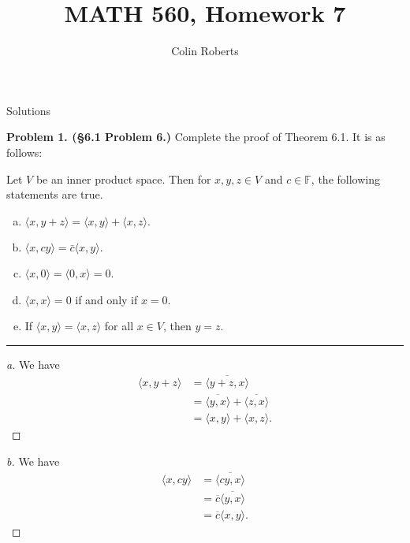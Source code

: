 \documentclass[leqno]{article}
\author{Colin Roberts}
\title{MATH 560, Homework 7}
\theoremstyle{nonumberplain}
\newtheorem{proof}{Proof}
\begin{document}
\maketitle
\begin{large}
\begin{center}
Solutions
\end{center}
\end{large}
\pagebreak

\noindent\textbf{Problem 1. (\S 6.1 Problem 6.)} Complete the proof of Theorem 6.1.   It is as follows:

\noindent Let $V$ be an inner product space.  Then for $x,y,z \in V$ and $c\in \mathbb{F}$, the following statements are true.
\begin{enumerate}[(a)]
\item $\langle x,y+z\rangle = \langle x,y \rangle + \langle x,z\rangle$.
\item $\langle x,cy\rangle = \bar{c}\langle x,y \rangle.$
\item $\langle x,0\rangle = \langle 0, x \rangle = 0$.
\item $\langle x,x \rangle =0$ if and only if $x=0$.
\item If $\langle x,y \rangle = \langle x,z \rangle$ for all $x\in V$, then $y=z$.
\end{enumerate}
\noindent\rule[0.5ex]{\linewidth}{1pt}

\begin{proof}[a]
We have 
\begin{align*}
\langle x,y+z \rangle &= \overline{\langle y+z,x \rangle}\\
&= \overline{\langle y,x \rangle}+\overline{\langle z,x \rangle}\\
&=\langle x,y \rangle + \langle x,z \rangle.
\end{align*}
\end{proof}

\begin{proof}[b]
We have
\begin{align*}
\langle x,cy \rangle &= \overline{\langle cy,x \rangle}\\
&=\overline{c} \overline{\langle y,x \rangle}\\
&=\overline{c} \langle x,y \rangle.
\end{align*}
\end{proof}
\end{document}
